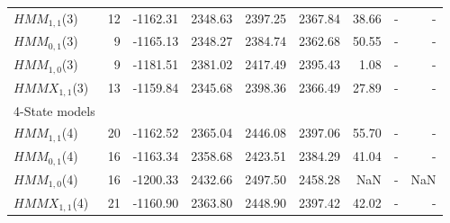 \documentclass[11pt,a4paper,oneside]{article}
\begin{document}
\begin{table}[h!]
\begin{tabular}{lrrrrrrrr}
\hspace{3mm}$HMM_{1,1}$(3) & 12 & -1162.31 & 2348.63 & 2397.25 & 2367.84 & 38.66 & - & -  \\

\hspace{3mm}$HMM_{0,1}$(3) & 9 & -1165.13 & 2348.27 & 2384.74 & 2362.68 & 50.55 & - & -  \\

\hspace{3mm}$HMM_{1,0}$(3) & 9 & -1181.51 & 2381.02 & 2417.49 & 2395.43 & 1.08 & - & -  \\

\hspace{3mm}$HMMX_{1,1}$(3)& 13 & -1159.84 & 2345.68 & 2398.36 & 2366.49 & 27.89 & - & -  \\

4-State models & & & & & & &  \\ 

\hspace{3mm}$HMM_{1,1}$(4) & 20 & -1162.52 & 2365.04 & 2446.08 & 2397.06 & 55.70 & - & - \\

\hspace{3mm}$HMM_{0,1}$(4) & 16 & -1163.34 & 2358.68 & 2423.51 & 2384.29 & 41.04 & - & - \\

\hspace{3mm}$HMM_{1,0}$(4) & 16 & -1200.33 & 2432.66 & 2497.50 & 2458.28
 & NaN & - & NaN \\

\hspace{3mm}$HMMX_{1,1}$(4)& 21 & -1160.90 & 2363.80 & 2448.90 & 2397.42 & 42.02 & - & -  \\






\end{tabular}
\end{table}
\end{document}
